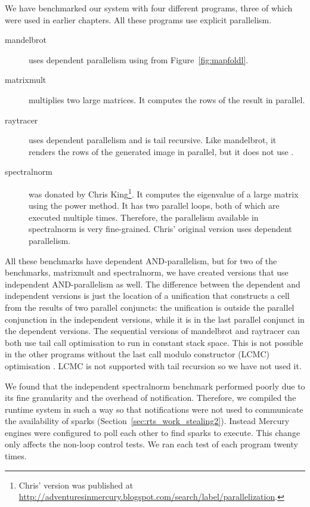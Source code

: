 We have benchmarked our system with four different programs,
three of which were used in earlier chapters.
All these programs use explicit parallelism.
\begin{description}
\item[mandelbrot] uses dependent parallelism using \mapfoldl from
Figure~\ref{fig:mapfoldl}.

\item[matrixmult]
multiplies two large matrices.
It computes the rows of the result in parallel.

\item[raytracer] uses dependent parallelism and is tail recursive.
Like mandelbrot, it renders the rows of the generated image in parallel,
but it does not use \mapfoldl{}.

\item[spectralnorm]
was donated by Chris King\footnote{Chris' version was published at
\url{http://adventuresinmercury.blogspot.com/search/label/parallelization}.}.
It computes the eigenvalue of a large matrix using the power method.
It has two parallel loops, both of which are executed multiple times.
Therefore, the parallelism available in spectralnorm is very fine-grained.
Chris' original version uses dependent parallelism.
\end{description}

\noindent
All these benchmarks have dependent AND-parallelism,
but for two of the benchmarks, matrixmult and spectralnorm,
we have created versions that use independent AND-parallelism as well.
The difference between the dependent and independent versions
is just the location of a unification that constructs a cell
from the results of two parallel conjuncts:
the unification is outside the parallel conjunction in the independent versions,
while it is in the last parallel conjunct in the dependent versions.
The sequential versions of mandelbrot and raytracer can both use tail call
optimisation to run in constant stack space.
This is not possible in the other programs without
the last call modulo constructor (LCMC)
optimisation \citep{ross:mercury-lcmc}.
LCMC is not supported with tail recursion so we have not used it.

We found that the independent spectralnorm benchmark performed poorly due
to its fine granularity and the overhead of notification.
Therefore, we compiled the runtime system in such a way so that
notifications were not used to communicate the availability of sparks
(Section~\ref{sec:rts_work_stealing2}).
Instead Mercury engines were configured to poll each other to find sparks
to execute.
This change only affects the non-loop control tests.
We ran each test of each program twenty times.

